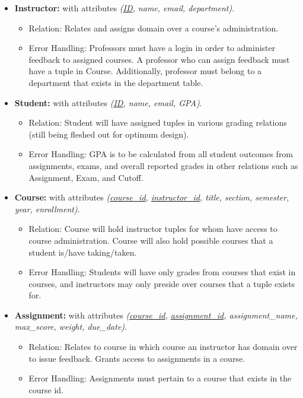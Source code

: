 \documentclass[12pt]{article}
\begin{document}
\begin{itemize}

    \item \textbf{Instructor:} with attributes \textit{(\underline{ID}, name, email, department)}.
    \begin{itemize}
        \item Relation: Relates and assigns domain over a course's administration. 
        \item Error Handling: Professors must have a login in order to administer feedback to assigned courses. A professor who can assign feedback must have a tuple in Course. Additionally, professor must belong to a department that exists in the department table. 
    \end{itemize}
    
    \item \textbf{Student:} with attributes \textit{(\underline{ID}, name, email, GPA)}.
    \begin{itemize}
        \item Relation: Student will have assigned tuples in various grading relations (still being fleshed out for optimum design). 
        \item Error Handling: GPA is to be calculated from all student outcomes from assignments, exams, and overall reported grades in other relations such as Assignment, Exam, and Cutoff. 
    \end{itemize}
    
    \item \textbf{Course:} with attributes \textit{(\underline{course\_id}, \underline{instructor\_id}, title, section, semester, year, enrollment)}.
    \begin{itemize}
        \item Relation: Course will hold instructor tuples for whom have access to course administration. Course will also hold possible courses that a student is/have taking/taken. 
        \item Error Handling: Students will have only grades from courses that exist in courses, and instructors may only preside over courses that a tuple exists for. 
    \end{itemize}

    \item \textbf{Assignment:} with attributes \textit{(\underline{course\_id}, 
    \underline{assignment\_id}, assignment\_name, max\_score, weight, due\_date)}.
        \begin{itemize}
        \item Relation: Relates to course in which course an instructor has domain over to issue feedback. Grants access to assignments in a course. 
        \item Error Handling: Assignments must pertain to a course that exists in the course id. 
    \end{itemize}
    

\end{itemize}
\end{document}
